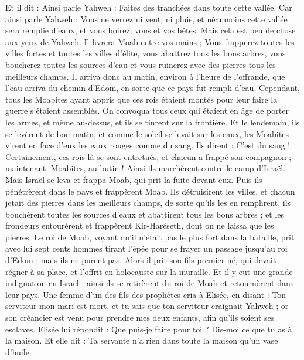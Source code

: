 \begin{multicols}{2}
Et il dit : Ainsi parle Yahweh : Faites des tranchées dans toute cette vallée.
Car ainsi parle Yahweh : Vous ne verrez ni vent, ni pluie, et néanmoins cette vallée sera remplie d'eaux, et vous boirez, vous et vos bêtes.
Mais cela est peu de chose aux yeux de Yahweh. Il livrera Moab entre vos mains ;
Vous frapperez toutes les villes fortes et toutes les villes d'élite, vous abattrez tous les bons arbres, vous boucherez toutes les sources d'eau et vous ruinerez avec des pierres tous les meilleurs champs.
Il arriva donc au matin, environ à l'heure de l'offrande, que l'eau arriva du chemin d'Edom, en sorte que ce pays fut rempli d'eau.
Cependant, tous les Moabites ayant appris que ces rois étaient montés pour leur faire la guerre s'étaient assemblés. On convoqua tous ceux qui étaient en âge de porter les armes, et même au-dessus, et ils se tinrent sur la frontière.
Et le lendemain, ils se levèrent de bon matin, et comme le soleil se levait sur les eaux, les Moabites virent en face d'eux les eaux rouges comme du sang.
Ils dirent : C'est du sang ! Certainement, ces rois-là se sont entretués, et chacun a frappé son compagnon ; maintenant, Moabites, au butin !
Ainsi ils marchèrent contre le camp d'Israël. Mais Israël se leva et frappa Moab, qui prit la fuite devant eux. Puis ils pénétrèrent dans le pays et frappèrent Moab.
Ils détruisirent les villes, et chacun jetait des pierres dans les meilleurs champs, de sorte qu'ils les en remplirent, ils bouchèrent toutes les sources d'eaux et abattirent tous les bons arbres ; et les frondeurs entourèrent et frappèrent Kir-Haréseth, dont on ne laissa que les pierres.
Le roi de Moab, voyant qu'il n'était pas le plus fort dans la bataille, prit avec lui sept cents hommes tirant l'épée pour se frayer un passage jusqu'au roi d'Edom ; mais ils ne purent pas.
Alors il prit son fils premier-né, qui devait régner à sa place, et l'offrit en holocauste sur la muraille. Et il y eut une grande indignation en Israël ; ainsi ils se retirèrent du roi de Moab et retournèrent dans leur pays.
\VerseOne{}Une femme d'un des fils des prophètes cria à Elisée, en disant : Ton serviteur mon mari est mort, et tu sais que ton serviteur craignait Yahweh ; or son créancier est venu pour prendre mes deux enfants, afin qu'ils soient ses esclaves.
Elisée lui répondit : Que puis-je faire pour toi ? Dis-moi ce que tu as à la maison. Et elle dit : Ta servante n'a rien dans toute la maison qu'un vase d'huile.

\end{multicols}
